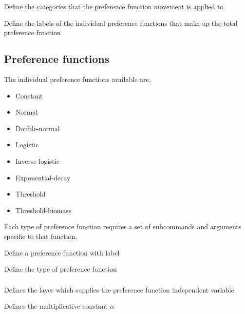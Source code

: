  {Define the categories that the preference function movement is applied to}

 {Define the labels of the individual  preference functions that make up the total preference function}

\subsection{Preference functions}

The individual preference functions available are, 

\begin{itemize}
	\item Constant
	\item Normal
	\item Double-normal
	\item Logistic
	\item Inverse logistic
	\item Exponential-decay
	\item Threshold
	\item Threshold-biomass	
\end{itemize}

Each type of preference function requires a set of subcommands and arguments specific to that function.

 {Define a preference function with label}

 {Define the type of preference function}

\subsubsection[Constant]{}

 {Defines the layer which supplies the preference function independent variable}

 {Defines the multiplicative constant $\alpha$}

\subsubsection[Normal]{}

